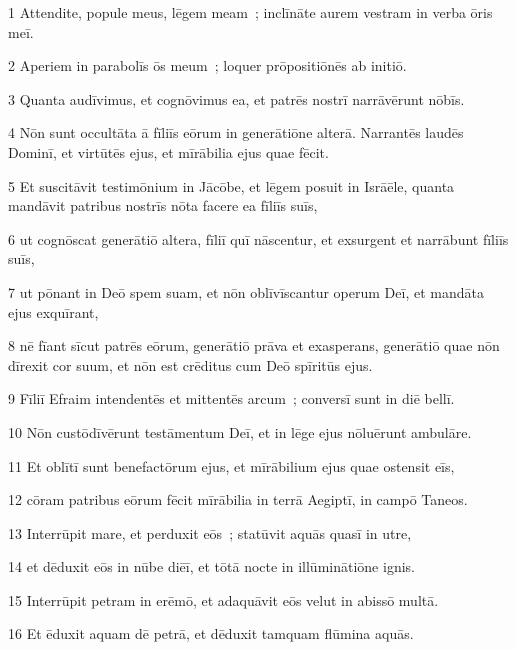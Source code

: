 
\psalmVerse
  {\phantom{00}1}
  {Attendite, popule meus, lēgem meam~; inclīnāte aurem vestram in verba ōris meī.}


\psalmVerse
  {\phantom{00}2}
  {Aperiem in parabolīs ōs meum~; loquer prōpositiōnēs ab initiō.}


\psalmVerse
  {\phantom{00}3}
  {Quanta audīvimus, et cognōvimus ea, et patrēs nostrī narrāvērunt nōbīs.}


\psalmVerse
  {\phantom{00}4}
  {Nōn sunt occultāta ā fīliīs eōrum in generātiōne alterā. Narrantēs laudēs Dominī, et virtūtēs ejus, et mīrābilia ejus quae fēcit.}


\psalmVerse
  {\phantom{00}5}
  {Et suscitāvit testimōnium in Jācōbe, et lēgem posuit in Isrāēle, quanta mandāvit patribus nostrīs nōta facere ea fīliīs suīs,}


\psalmVerse
  {\phantom{00}6}
  {ut cognōscat generātiō altera, fīliī quī nāscentur, et exsurgent et narrābunt fīliīs suīs,}


\psalmVerse
  {\phantom{00}7}
  {ut pōnant in Deō spem suam, et nōn oblīvīscantur operum Deī, et mandāta ejus exquīrant,}


\psalmVerse
  {\phantom{00}8}
  {nē fīant sīcut patrēs eōrum, generātiō prāva et exasperans, generātiō quae nōn dīrexit cor suum, et nōn est crēditus cum Deō spīritūs ejus.}


\psalmVerse
  {\phantom{00}9}
  {Fīliī Efraim intendentēs et mittentēs arcum~; conversī sunt in diē bellī.}


\psalmVerse
  {\phantom{0}10}
  {Nōn custōdīvērunt testāmentum Deī, et in lēge ejus nōluērunt ambulāre.}


\psalmVerse
  {\phantom{0}11}
  {Et oblītī sunt benefactōrum ejus, et mīrābilium ejus quae ostensit eīs,}


\psalmVerse
  {\phantom{0}12}
  {cōram patribus eōrum fēcit mīrābilia in terrā Aegiptī, in campō Taneos.}


\psalmVerse
  {\phantom{0}13}
  {Interrūpit mare, et perduxit eōs~; statūvit aquās quasī in utre,}


\psalmVerse
  {\phantom{0}14}
  {et dēduxit eōs in nūbe diēī, et tōtā nocte in illūminātiōne ignis.}


\psalmVerse
  {\phantom{0}15}
  {Interrūpit petram in erēmō, et adaquāvit eōs velut in abissō multā.}


\psalmVerse
  {\phantom{0}16}
  {Et ēduxit aquam dē petrā, et dēduxit tamquam flūmina aquās.}


